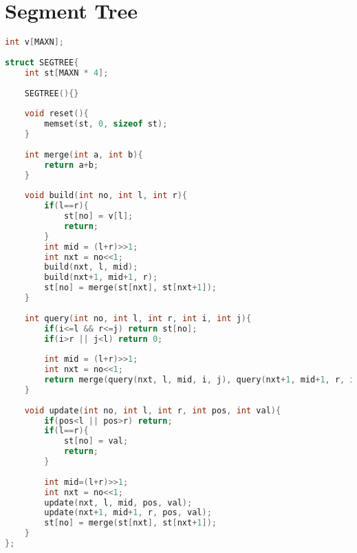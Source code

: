 \documentclass[12pt,a4paper,twoside]{report}
\begin{document}
\section{Segment Tree}
\noindent\begin{lstlisting}[caption=Segment Tree,language=C++]
int v[MAXN];
 
struct SEGTREE{
    int st[MAXN * 4];
     
    SEGTREE(){}
     
    void reset(){
        memset(st, 0, sizeof st);
    }
     
    int merge(int a, int b){
        return a+b;
    }
     
    void build(int no, int l, int r){
        if(l==r){
            st[no] = v[l];
            return;
        }
        int mid = (l+r)>>1;
        int nxt = no<<1;
        build(nxt, l, mid);
        build(nxt+1, mid+1, r);
        st[no] = merge(st[nxt], st[nxt+1]);
    }
         
    int query(int no, int l, int r, int i, int j){
        if(i<=l && r<=j) return st[no];
        if(i>r || j<l) return 0;
         
        int mid = (l+r)>>1;
        int nxt = no<<1;
        return merge(query(nxt, l, mid, i, j), query(nxt+1, mid+1, r, i, j));
    }
 
    void update(int no, int l, int r, int pos, int val){
        if(pos<l || pos>r) return;
        if(l==r){
            st[no] = val;
            return;
        }
         
        int mid=(l+r)>>1;
        int nxt = no<<1;
        update(nxt, l, mid, pos, val);
        update(nxt+1, mid+1, r, pos, val);
        st[no] = merge(st[nxt], st[nxt+1]);
    }
};
\end{lstlisting}
\end{document}

